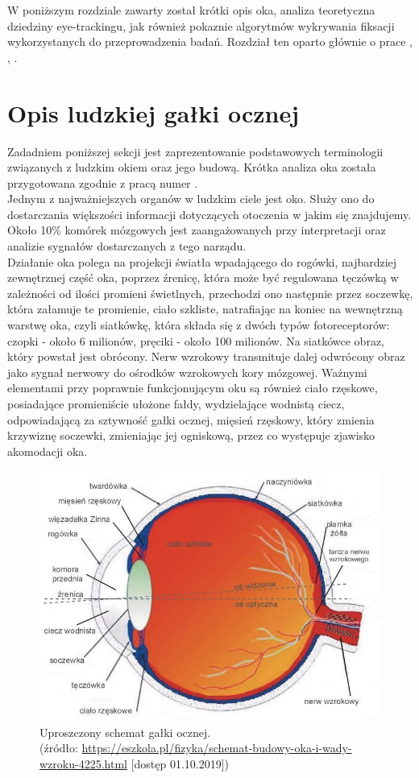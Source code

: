 W poniższym rozdziale zawarty został krótki opis oka, analiza teoretyczna dziedziny eye-trackingu, jak również pokaznie algorytmów wykrywania fiksacji wykorzystanych do przeprowadzenia badań. Rozdział ten oparto głównie o prace \cite{Main}, \cite{EvaluationMethodology}, \cite{MachineLearning}.
\section{Opis ludzkiej gałki ocznej}
Zadadniem poniższej sekcji jest zaprezentowanie podstawowych terminologii związanych z ludzkim okiem oraz jego budową. Krótka analiza oka została przygotowana zgodnie z pracą numer \cite{EvaluationMethodology}.\\
Jednym z najważniejszych organów w ludzkim ciele jest oko. Służy ono do dostarczania większości informacji dotyczących otoczenia w jakim się znajdujemy. Około 10\% komórek mózgowych jest zaangażowanych przy interpretacji oraz analizie sygnałów dostarczanych z tego narządu.\\
Działanie oka polega na projekcji światła wpadającego do rogówki, najbardziej zewnętrznej część oka, poprzez źrenicę, która może być regulowana tęczówką w zależności od ilości promieni świetlnych, przechodzi ono następnie przez soczewkę, która załamuje te promienie, ciało szkliste, natrafiając na koniec na wewnętrzną warstwę oka, czyli siatkówkę, która składa się z dwóch typów fotoreceptorów: czopki - około 6 milionów, pręciki - około 100 milionów. Na siatkówce obraz, który powstał jest obrócony. Nerw wzrokowy transmituje dalej odwrócony obraz jako sygnał nerwowy do ośrodków wzrokowych kory mózgowej. Ważnymi elementami przy poprawnie funkcjonującym oku są również ciało rzęskowe, posiadające promieniście ułożone fałdy, wydzielające wodnistą ciecz, odpowiadającą za sztywność gałki ocznej, mięsień rzęskowy, który zmienia krzywiznę soczewki, zmieniając jej ogniskową, przez co występuje zjawisko akomodacji oka. 
\begin{figure}[H]
    \centering
    \captionsetup{justification=centering,margin=2cm}
    \includegraphics[width=0.8\linewidth]{resources/oko_galka.jpg}
    \caption[Przekrój oka.]{Uproszczony schemat gałki ocznej.\\\hspace{\textwidth} 
    \small(źródło: \url{https://eszkola.pl/fizyka/schemat-budowy-oka-i-wady-wzroku-4225.html} [dostęp 01.10.2019])}
    \label{fig:budowaoka}
\end{figure}

